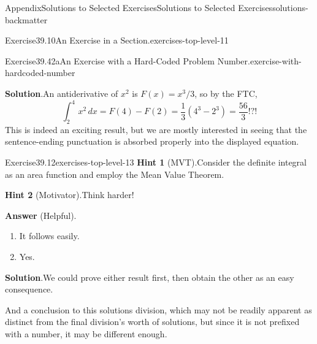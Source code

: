 \documentclass[twoside,10pt,]{article}
\newcommand{\blocktitlefont}{\relax}
\numberwithin{equation}{section}
\newcommand{\definiteintegral}[4]{\int_{#1}^{#2}\,#3\,d#4}
\begin{document}
\begin{solutions-section}{Appendix}{Solutions to Selected Exercises}{}{Solutions to Selected Exercises}{}{}{solutions-backmatter}
\begin{divisionsolution}{Exercise}{39.10}{An Exercise in a Section.}{exercises-top-level-11}
\end{divisionsolution}%
\begin{divisionsolution}{Exercise}{39.42a}{An Exercise with a Hard-Coded Problem Number.}{exercise-with-hardcoded-number}%
\par\smallskip%
\noindent\textbf{\blocktitlefont Solution}.\hypertarget{solution-antiderivative-back}{}\quad{}An antiderivative of \(x^2\) is \(F(x)=x^3/3\), so by the FTC,%
\begin{equation*}
\definiteintegral{2}{4}{x^2}{x}=F(4)-F(2)=\frac{1}{3}\left(4^3-2^3\right)=\frac{56}{3}\text{!?!}
\end{equation*}
This is indeed an exciting result, but we are mostly interested in seeing that the sentence-ending punctuation is absorbed properly into the displayed equation.%
\end{divisionsolution}%
\begin{divisionsolution}{Exercise}{39.12}{}{exercises-top-level-13}%
\noindent\textbf{\blocktitlefont Hint 1} (MVT).\hypertarget{exercises-top-level-13-2-back}{}\quad{}Consider the definite integral as an area function and employ the Mean Value Theorem.%
\par\smallskip%
\noindent\textbf{\blocktitlefont Hint 2} (Motivator).\hypertarget{exercise-complicated-second-hint-back}{}\quad{}Think harder!%
\par\smallskip%
\noindent\textbf{\blocktitlefont Answer} (Helpful).\hypertarget{exercise-complicated-first-answer-back}{}\quad{}%
\begin{enumerate}[label={(\alph*)}]
\item{}It follows easily.%
\item{}Yes.%
\end{enumerate}
%
\par\smallskip%
\noindent\textbf{\blocktitlefont Solution}.\hypertarget{exercises-top-level-13-5-back}{}\quad{}We could prove either result first, then obtain the other as an easy consequence.%
\end{divisionsolution}%
\begin{conclusion}{}%
And a conclusion to this solutions division, which may not be readily apparent as distinct from the final division's worth of solutions, but since it is not prefixed with a number, it may be different enough.%
\end{conclusion}%
\end{solutions-section}
%
%
\typeout{************************************************}
\typeout{************************************************}
\end{document}
